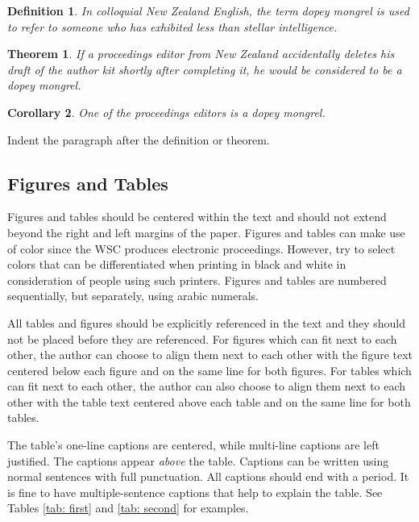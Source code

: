 \documentclass{wscpaperproc}
\theoremstyle{wsc}
\newtheorem{theorem}{Theorem}
\newtheorem{corollary}[theorem]{Corollary}
\newtheorem{definition}{Definition}
\begin{document}
\begin{definition}
In colloquial New Zealand English, the term {\em dopey mongrel} is used to refer to someone who has exhibited less than stellar intelligence.
\end{definition}

\begin{theorem}
If a proceedings editor from New Zealand accidentally deletes his draft of the author kit shortly after completing it, he would be considered to be a dopey mongrel.
\end{theorem}

\begin{corollary}
One of the proceedings editors is a dopey mongrel.
\end{corollary}

Indent the paragraph after the definition or theorem.

\subsection{Figures and Tables}
\label{sec:graphics}
Figures and tables should be centered within the text and should not extend beyond the right and left margins of the paper.
Figures and tables can make use of color since the WSC produces electronic proceedings.
However, try to select colors that can be differentiated when printing in black and white in consideration of people using such printers. Figures and tables are numbered sequentially, but separately, using arabic numerals.

All tables and figures should be explicitly referenced in the text and they should not be placed before they are referenced. For figures which can fit next to each other, the author can choose to align them next to each other with the figure text centered below each figure and on the same line for both figures. For tables which can fit next to each other, the author can also choose to align them next to each other with the table text centered above each table and on the same line for both tables. 

The table's one-line captions are centered, while multi-line captions are left justified.
The captions appear {\em above} the table. 
Captions can be written using normal sentences with full punctuation. All captions should end with a period. It is fine to have multiple-sentence captions that help to explain the table. 
See Tables \ref{tab: first} and \ref{tab: second} for examples.
\end{document}
